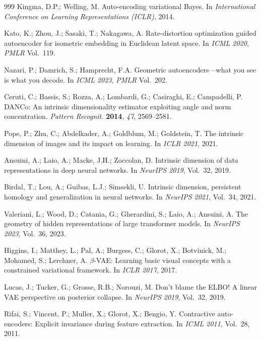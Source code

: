\documentclass[make,article,submit,pdftex,moreauthors]{Definitions/mdpi}
\begin{document}
\begin{thebibliography}{999}
Kingma, D.P.; Welling, M.
Auto-encoding variational Bayes.
In \textit{International Conference on Learning Representations (ICLR)},
2014.

Kato, K.; Zhou, J.; Sasaki, T.; Nakagawa, A.
Rate-distortion optimization guided autoencoder for isometric embedding in
Euclidean latent space.
In \textit{ICML 2020}, \textit{PMLR} Vol.~119.

Nazari, P.; Damrich, S.; Hamprecht, F.A.
Geometric autoencoders---what you see is what you decode.
In \textit{ICML 2023}, \textit{PMLR} Vol.~202.

Ceruti, C.; Bassis, S.; Rozza, A.; Lombardi, G.; Casiraghi, E.;
Campadelli, P.
DANCo: An intrinsic dimensionality estimator exploiting angle and norm
concentration.
\textit{Pattern Recognit.} \textbf{2014}, \textit{47}, 2569--2581.

Pope, P.; Zhu, C.; Abdelkader, A.; Goldblum, M.; Goldstein, T.
The intrinsic dimension of images and its impact on learning.
In \textit{ICLR 2021}, 2021.

Ansuini, A.; Laio, A.; Macke, J.H.; Zoccolan, D.
Intrinsic dimension of data representations in deep neural networks.
In \textit{NeurIPS 2019}, Vol.~32, 2019.

Birdal, T.; Lou, A.; Guibas, L.J.; Simsekli, U.
Intrinsic dimension, persistent homology and generalization in neural
networks.
In \textit{NeurIPS 2021}, Vol.~34, 2021.

Valeriani, L.; Wood, D.; Catania, G.; Gherardini, S.; Laio, A.; Ansuini, A.
The geometry of hidden representations of large transformer models.
In \textit{NeurIPS 2023}, Vol.~36, 2023.

Higgins, I.; Matthey, L.; Pal, A.; Burgess, C.; Glorot, X.; Botvinick, M.;
Mohamed, S.; Lerchner, A.
$\beta$-VAE: Learning basic visual concepts with a constrained variational
framework.
In \textit{ICLR 2017}, 2017.

Lucas, J.; Tucker, G.; Grosse, R.B.; Norouzi, M.
Don't blame the ELBO! A linear VAE perspective on posterior collapse.
In \textit{NeurIPS 2019}, Vol.~32, 2019.

Rifai, S.; Vincent, P.; Muller, X.; Glorot, X.; Bengio, Y.
Contractive auto-encoders: Explicit invariance during feature extraction.
In \textit{ICML 2011}, Vol.~28, 2011.


\end{thebibliography}
\end{document}
